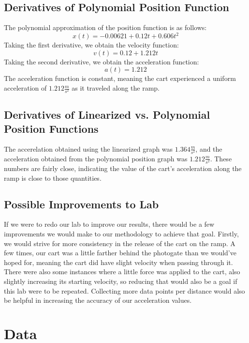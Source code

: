 \documentclass{article}
\begin{document}
\subsection{Derivatives of Polynomial Position Function}
The polynomial approximation of the position function is as follows:
\[x(t) = -0.00621 + 0.12t + 0.606t^2\]
Taking the first derivative, we obtain the velocity function:
\[v(t) = 0.12 + 1.212t\]
Taking the second derivative, we obtain the acceleration function:
\[a(t) = 1.212\]
The acceleration function is constant, meaning the cart experienced a uniform acceleration of $1.212 \frac{m}{s ^ 2}$ as it traveled along the ramp.

\subsection{Derivatives of Linearized vs. Polynomial Position Functions}
The accerelation obtained using the linearized graph was $1.364 \frac{m}{s ^ 2}$, and the acceleration obtained from the polynomial position graph was $1.212 \frac{m}{s ^ 2}$. These numbers are fairly close, indicating the value of the cart's acceleration along the ramp is close to those quantities.

\subsection{Possible Improvements to Lab}
If we were to redo our lab to improve our results, there would be a few improvements we would make to our methodology to achieve that goal. Firstly, we would strive for more consistency in the release of the cart on the ramp. A few times, our cart was a little farther behind the photogate than we would've hoped for, meaning the cart did have slight velocity when passing through it. There were also some instances where a little force was applied to the cart, also slightly increasing its starting velocity, so reducing that would also be a goal if this lab were to be repeated. Collecting more data points per distance would also be helpful in increasing the accuracy of our acceleration values.


\appendix
\section{Data}
\end{document}
